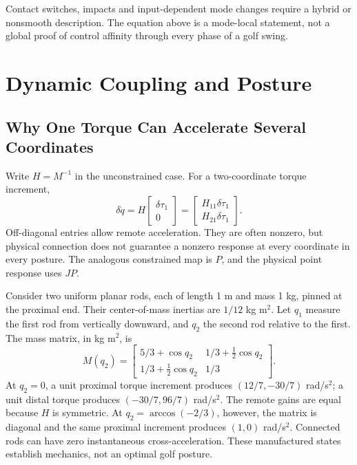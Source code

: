 Contact switches, impacts and input-dependent mode changes require a hybrid or nonsmooth description. The equation above is a mode-local statement, not a global proof of control affinity through every phase of a golf swing.

\section{Dynamic Coupling and Posture}
\label{sec:dynamic_coupling}

\subsection{Why One Torque Can Accelerate Several Coordinates}
Write \(H=M^{-1}\) in the unconstrained case. For a two-coordinate torque increment,
\begin{equation}
 \delta\ddot q=H\begin{bmatrix}\delta\tau_1\\0\end{bmatrix}
 =\begin{bmatrix}H_{11}\delta\tau_1\\H_{21}\delta\tau_1\end{bmatrix}.
 \label{eq:iaa_coupling}
\end{equation}
Off-diagonal entries allow remote acceleration. They are often nonzero, but physical connection does not guarantee a nonzero response at every coordinate in every posture. The analogous constrained map is \(P\), and the physical point response uses \(JP\).

Consider two uniform planar rods, each of length 1 m and mass 1 kg, pinned at the proximal end. Their center-of-mass inertias are \(1/12\) kg m\(^2\). Let \(q_1\) measure the first rod from vertically downward, and \(q_2\) the second rod relative to the first. The mass matrix, in kg m\(^2\), is
\[
 M(q_2)=\begin{bmatrix}
 5/3+\cos q_2&1/3+\tfrac12\cos q_2\\
 1/3+\tfrac12\cos q_2&1/3
 \end{bmatrix}.
\]
At \(q_2=0\), a unit proximal torque increment produces \((12/7,-30/7)\) rad/s\(^2\); a unit distal torque produces \((-30/7,96/7)\) rad/s\(^2\). The remote gains are equal because \(H\) is symmetric. At \(q_2=\arccos(-2/3)\), however, the matrix is diagonal and the same proximal increment produces \((1,0)\) rad/s\(^2\). Connected rods can have zero instantaneous cross-acceleration. These manufactured states establish mechanics, not an optimal golf posture.


